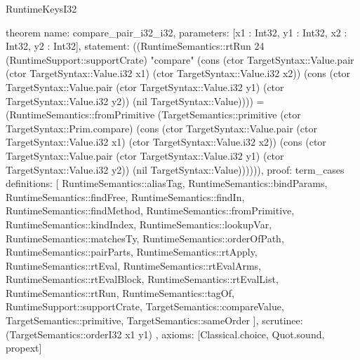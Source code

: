 \begin{lexlean}{RuntimeKeysI32}
\begin{semanticmodule}
theorem{
  name: compare_pair_i32_i32,
  parameters: [x1 : Int32, y1 : Int32, x2 : Int32, y2 : Int32],
  statement: ((RuntimeSemantics::rtRun 24 (RuntimeSupport::supportCrate) "compare" (cons (ctor TargetSyntax::Value.pair (ctor TargetSyntax::Value.i32 x1) (ctor TargetSyntax::Value.i32 x2)) (cons (ctor TargetSyntax::Value.pair (ctor TargetSyntax::Value.i32 y1) (ctor TargetSyntax::Value.i32 y2)) (nil TargetSyntax::Value)))) = (RuntimeSemantics::fromPrimitive (TargetSemantics::primitive (ctor TargetSyntax::Prim.compare) (cons (ctor TargetSyntax::Value.pair (ctor TargetSyntax::Value.i32 x1) (ctor TargetSyntax::Value.i32 x2)) (cons (ctor TargetSyntax::Value.pair (ctor TargetSyntax::Value.i32 y1) (ctor TargetSyntax::Value.i32 y2)) (nil TargetSyntax::Value)))))),
  proof: term_cases{
    definitions: [
      RuntimeSemantics::aliasTag,
      RuntimeSemantics::bindParams,
      RuntimeSemantics::findFree,
      RuntimeSemantics::findIn,
      RuntimeSemantics::findMethod,
      RuntimeSemantics::fromPrimitive,
      RuntimeSemantics::kindIndex,
      RuntimeSemantics::lookupVar,
      RuntimeSemantics::matchesTy,
      RuntimeSemantics::orderOfPath,
      RuntimeSemantics::pairParts,
      RuntimeSemantics::rtApply,
      RuntimeSemantics::rtEval,
      RuntimeSemantics::rtEvalArms,
      RuntimeSemantics::rtEvalBlock,
      RuntimeSemantics::rtEvalList,
      RuntimeSemantics::rtRun,
      RuntimeSemantics::tagOf,
      RuntimeSupport::supportCrate,
      TargetSemantics::compareValue,
      TargetSemantics::primitive,
      TargetSemantics::sameOrder
    ],
    scrutinee: (TargetSemantics::orderI32 x1 y1)
  },
  axioms: [Classical.choice, Quot.sound, propext]
}


\end{semanticmodule}
\end{lexlean}
